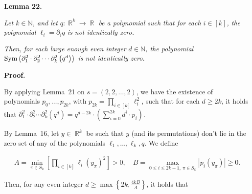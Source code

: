 \documentclass[10pt,a4paper]{article}
\begin{document}


\par\medskip\noindent\textbf{
\textbf{Lemma 22}\textbf{.}
}\par



\emph{Let $k\in\mathbb{N}$, and let $q:\mathop{\mathbb{R}}^{k}\to\mathop{\mathbb{R}}$ be a polynomial such that for each $i\in[k]$, the polynomial $\ell_{i}=\partial_{i}q$ is not identically zero.}\par




\emph{Then, for each large enough even integer $d\in\mathbb{N}$, the polynomial $\textnormal{Sym}\left(\partial_{1}^{2}\cdot\partial_{2}^{2}\cdots\partial_{k}^{2}\left(q^{d}\right)\right)$ is not identically zero.}\par







\par\medskip\noindent\textbf{Proof.}\par




By applying Lemma 21 on $s=(2,2,\dots,2)$, we have the existence of polynomials $p_{0},\dots,p_{2k}$, with $p_{2k}=\prod_{i\in[k]}\ell_{i}^{2}$, such that for each $d\geqslant 2k$, it holds that $\partial_{1}^{2}\cdot\partial_{2}^{2}\cdots\partial_{k}^{2}\left(q^{d}\right)=q^{d-2k}\cdot\left(\sum_{i=0}^{2k}d^{i}\cdot p_{i}\right)$.\par




By Lemma 16, let $y\in\mathop{\mathbb{R}}^{k}$ be such that $y$ (and its permutations) don’t lie in the zero set of any of the polynomials $\ell_{1},\dots,\ell_{k},q$.
We define\par


\[\begin{gathered}
A=\min_{\pi\in S_{k}}\left[\prod_{i\in[k]}\ell_{i}\left(y_{\pi}\right)^{2}\right]>0,\quad B=\max_{0\leqslant i\leqslant 2k-1,\ \pi\in S_{k}}\left|p_{i}(y_{\pi})\right|\geqslant 0.
\end{gathered}\]


Then, for any even integer $d\geqslant\max\left\{2k,\frac{4kB}{A}\right\}$, it holds that\par
\end{document}

